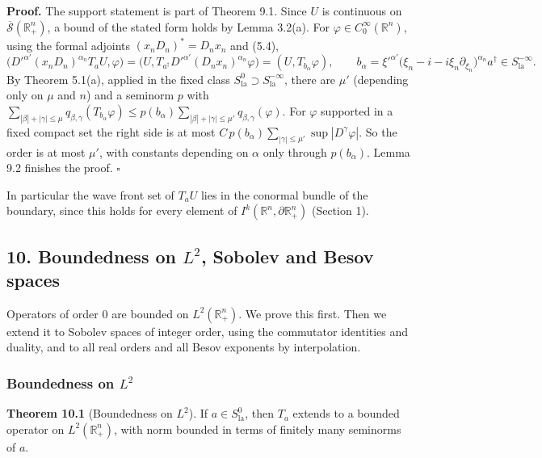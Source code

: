 \documentclass[
  11pt,
]{article}
\begin{document}
\textbf{Proof.} The support statement is part of Theorem 9.1. Since
\(U\) is continuous on \(\overline{\mathcal S}(\mathbb R^n_+)\), a bound
of the stated form holds by Lemma 3.2(a). For
\(\varphi\in C_0^\infty(\mathbb R^n)\), using the formal adjoints
\((x_nD_n)^*=D_nx_n\) and (5.4), {\footnotesize
\[
\big(D'^{\alpha'}(x_nD_n)^{\alpha_n}T_aU,\varphi\big)=\big(U,T_{a^\dagger}D'^{\alpha'}(D_nx_n)^{\alpha_n}\varphi\big)=(U,T_{b_\alpha}\varphi),\qquad
b_\alpha=\xi'^{\alpha'}\big(\xi_n-i-i\xi_n\partial_{\xi_n}\big)^{\alpha_n}a^\dagger\in S^{-\infty}_{\mathrm{la}} .
\]
} By Theorem 5.1(a), applied in the fixed class
\(S^0_{\mathrm{la}}\supset S^{-\infty}_{\mathrm{la}}\), there are
\(\mu'\) (depending only on \(\mu\) and \(n\)) and a seminorm \(p\) with
\(\sum_{|\beta|+|\gamma|\leq\mu}q_{\beta,\gamma}(T_{b_\alpha}\varphi)\leq p(b_\alpha)\sum_{|\beta|+|\gamma|\leq\mu'}q_{\beta,\gamma}(\varphi)\).
For \(\varphi\) supported in a fixed compact set the right side is at
most \(C\,p(b_\alpha)\sum_{|\gamma|\leq\mu'}\sup|D^\gamma\varphi|\). So
the order is at most \(\mu'\), with constants depending on \(\alpha\)
only through \(p(b_\alpha)\). Lemma 9.2 finishes the proof. \(\square\)

In particular the wave front set of \(T_aU\) lies in the conormal bundle
of the boundary, since this holds for every element of
\(I^k(\mathbb R^n,\partial\mathbb R^n_+)\) (Section 1).

\subsection{\texorpdfstring{10. Boundedness on \(L^2\), Sobolev and
Besov
spaces}{10. Boundedness on L\^{}2, Sobolev and Besov spaces}}\label{boundedness-on-l2-sobolev-and-besov-spaces}

Operators of order 0 are bounded on \(L^2(\mathbb R^n_+)\). We prove
this first. Then we extend it to Sobolev spaces of integer order, using
the commutator identities and duality, and to all real orders and all
Besov exponents by interpolation.

\subsubsection{\texorpdfstring{Boundedness on
\(L^2\)}{Boundedness on L\^{}2}}\label{boundedness-on-l2}

\textbf{Theorem 10.1} (Boundedness on \(L^2\)). If
\(a\in S^0_{\mathrm{la}}\), then \(T_a\) extends to a bounded operator
on \(L^2(\mathbb R^n_+)\), with norm bounded in terms of finitely many
seminorms of \(a\).
\end{document}
